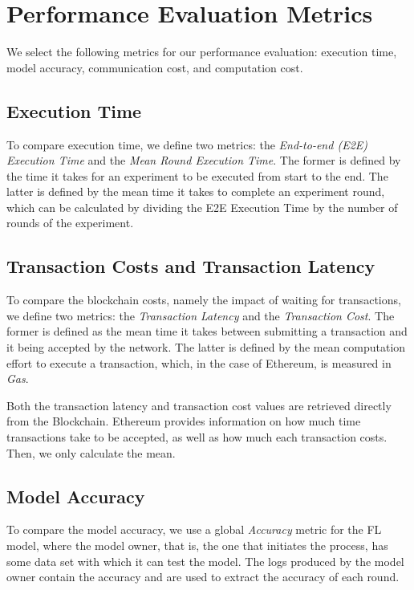 \section{Performance Evaluation Metrics}\label{eval:metrics}

We select the following metrics for our performance evaluation:  execution time, model accuracy, communication cost, and computation cost.

\subsection{Execution Time}

To compare execution time, we define two metrics: the \textit{End-to-end (E2E) Execution Time} and the \textit{Mean Round Execution Time}. The former is defined by the time it takes for an experiment to be executed from start to the end. The latter is defined by the mean time it takes to complete an experiment round, which can be calculated by dividing the E2E Execution Time by the number of rounds of the experiment.

\subsection{Transaction Costs and Transaction Latency}

To compare the blockchain costs, namely the impact of waiting for transactions, we define two metrics: the \textit{Transaction Latency} and the \textit{Transaction Cost}. The former is defined as the mean time it takes between submitting a transaction and it being accepted by the network. The latter is defined by the mean computation effort to execute a transaction, which, in the case of Ethereum, is measured in \textit{Gas}.

Both the transaction latency and transaction cost values are retrieved directly from the Blockchain. Ethereum provides information on how much time transactions take to be accepted, as well as how much each transaction costs. Then, we only calculate the mean.

\subsection{Model Accuracy}

To compare the model accuracy, we use a global \textit{Accuracy} metric for the FL model, where the model owner, that is, the one that initiates the process, has some data set with which it can test the model. The logs produced by the model owner contain the accuracy and are used to extract the accuracy of each round.


